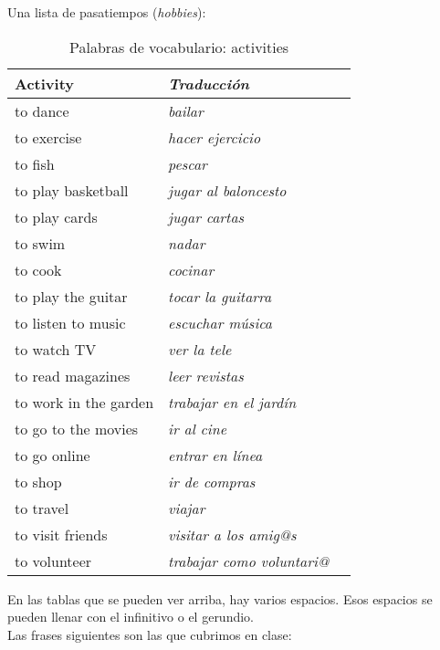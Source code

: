 Una lista de pasatiempos (\emph{hobbies}):
\begin{table}[H]
	\centering
	\begin{tabular}{lll}
	\toprule
		\textbf{Activity} & \textbf{\emph{Traducci\'on}} &\\
	\midrule
		to dance & \emph{bailar} \\
		to exercise & \emph{hacer ejercicio}  \\
		to fish & \emph{pescar} \\
		to play basketball & \emph{jugar al baloncesto} \\
		to play cards & \emph{jugar cartas} \\
		to swim & \emph{nadar} \\
		to cook & \emph{cocinar} \\
		to play the guitar & \emph{tocar la guitarra} \\
		to listen to music & \emph{escuchar música} \\
		to watch TV & \emph{ver la tele} \\
		to read magazines & \emph{leer revistas} \\
		to work in the garden & \emph{trabajar en el jardín} \\
		to go to the movies & \emph{ir al cine} \\
		to go online & \emph{entrar en línea} \\
		to shop & \emph{ir de compras} \\
		to travel & \emph{viajar} \\
		to visit friends & \emph{visitar a los amig@s} \\
		to volunteer & \emph{trabajar como voluntari@} \\
	\bottomrule
	\end{tabular}
	\caption{Palabras de vocabulario: activities}
\end{table}

En las tablas que se pueden ver arriba, hay varios espacios.
Esos espacios se pueden llenar con el infinitivo o el gerundio. \\

Las frases siguientes son las que cubrimos en clase:
